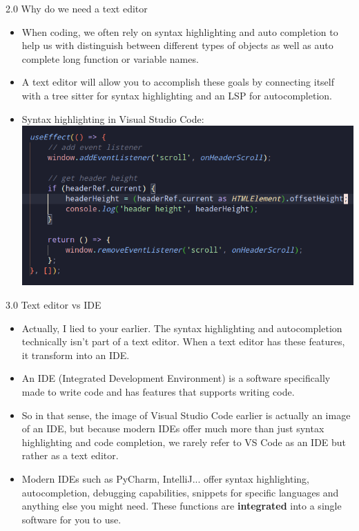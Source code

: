 \documentclass [aspectratio=169]{beamer}
\begin{document}
{
\begin{frame}{2.0 Why do we need a text editor}
    \begin{itemize}
        \item When coding, we often rely on syntax highlighting and auto completion to help us with distinguish between different types of objects as well as auto complete long
        function or variable names. 
        \item A text editor will allow you to accomplish these goals by connecting itself with a tree sitter for syntax highlighting and an LSP for autocompletion.
        \item Syntax highlighting in Visual Studio Code:
            {
                \centering
                \includegraphics[width=0.5\linewidth]{figures/vscode-treesitter.png}
            }
    \end{itemize}
\end{frame}
}
{
\begin{frame}{3.0 Text editor vs IDE}
    \begin{itemize}
        \item Actually, I lied to your earlier. The syntax highlighting and autocompletion technically isn't part of a text editor. When a text editor has these features, it transform into an IDE.
        \item An IDE (Integrated Development Environment) is a software specifically made to write code and has features that supports writing code.
        \item So in that sense, the image of Visual Studio Code earlier is actually an image of an IDE, but because modern IDEs offer much more than just syntax highlighting and code completion, we rarely refer to VS Code as an IDE but rather as a text editor.
        \item Modern IDEs such as PyCharm, IntelliJ... offer syntax highlighting, autocompletion, debugging capabilities, snippets for specific languages and anything else you might need. These functions are \textbf{integrated} into a single software for you to use.
    \end{itemize}
\end{frame}
}
\end{document}
